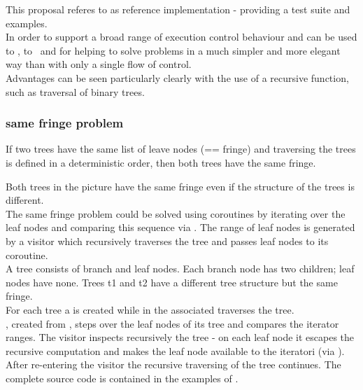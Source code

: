 
This proposal referes to \boostcoroutine as reference implementation - providing
a test suite and examples.\\
\newline
In order to support a broad range of execution control behaviour \pushcoro and
\pullcoro can be used to \escrecloops, to \escreccomps~and for \coopmultitasking
helping to solve problems in a much simpler and more elegant way than with only
a single flow of control.\\ Advantages can be seen particularly clearly with the use of a recursive
function, such as traversal of binary trees.

\subsubsection*{same fringe problem}

If two trees have the same list of leave nodes (== fringe) and traversing the
trees is defined in a deterministic order, then both trees have the same fringe.\\


Both trees in the picture have the same fringe even if the structure of the trees
is different.\\
\newline
The same fringe problem could be solved using coroutines by iterating over the leaf
nodes and comparing this sequence via . The range of leaf
nodes is generated by a visitor which recursively traverses the tree and passes
leaf nodes to its coroutine.\\
\newline
{}
A tree consists of branch and leaf nodes. Each branch node has two children;
leaf nodes have none. Trees t1 and t2 have a different tree structure but the
same fringe.\\
For each tree a \pullcoro is created while in the associated \corofunction
{} traverses the tree.\\
\coroiterator, created from \pullcoro, steps over the leaf nodes of its tree and
 compares the iterator ranges.
\newline
\newline
{}
The visitor inspects recursively the tree - on each leaf node it escapes the recursive
computation and makes the leaf node available to the iteratori (via \pushcoro).
After re-entering the visitor the recursive traversing of the tree continues.
\newline
The complete source code is contained in the examples of \boostcoroutine.

